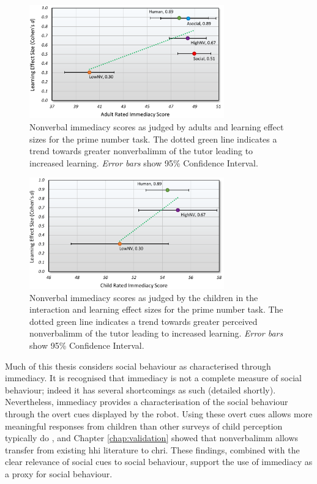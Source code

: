 \begin{figure}[t]
    \centering
    \includegraphics[width=0.75\textwidth]{images/ch10_adultnvilearn.pdf}
    \caption{Nonverbal immediacy scores as judged by adults and learning effect sizes for the prime number task. The dotted green line indicates a trend towards greater \gls{nonverbalimm} of the tutor leading to increased \gls{learning}. \textit{Error bars} show 95\% Confidence Interval.}
    \label{fig:ch10_nvilearngraph_adult}
\end{figure}

\begin{figure}[t]
    \centering
    \includegraphics[width=0.75\textwidth]{images/ch10_childnvilearn.pdf}
    \caption{Nonverbal immediacy scores as judged by the children in the interaction and \gls{learning} effect sizes for the prime number task. The dotted green line indicates a trend towards greater perceived \gls{nonverbalimm} of the tutor leading to increased learning. \textit{Error bars} show 95\% Confidence Interval.}
    \label{fig:ch10_nvilearngraph_child}
\end{figure}

Much of this thesis considers social behaviour as characterised through immediacy. It is recognised that immediacy is not a complete measure of social behaviour; indeed it has several shortcomings as such (detailed shortly). Nevertheless, immediacy provides a characterisation of the social behaviour through the overt cues displayed by the robot. Using these overt cues allows more meaningful responses from children than other surveys of child perception typically do \citep{kennedy2015characterise}, and Chapter \ref{chap:validation} showed that \gls{nonverbalimm} allows transfer from existing \acrshort{hhi} literature to \acrshort{chri}. These findings, combined with the clear relevance of social cues to social behaviour, support the use of immediacy as a proxy for social behaviour. 

